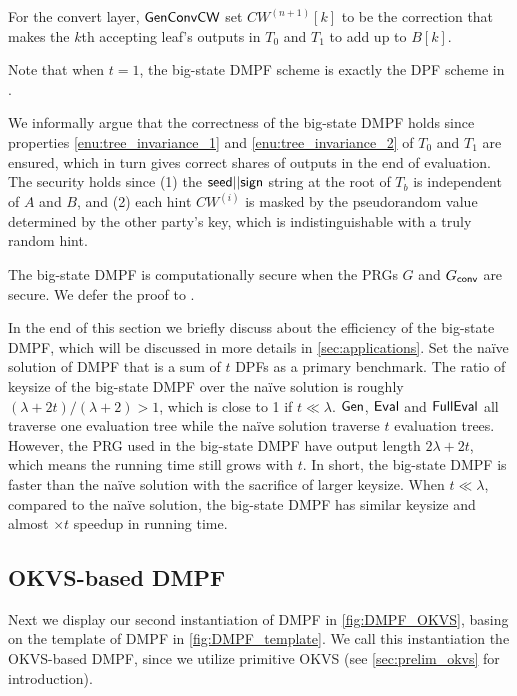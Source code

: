 For the convert layer, $\sf GenConvCW$ set $CW^{(n+1)}[k]$ to be the correction that makes the $k$th accepting leaf's outputs in $T_0$ and $T_1$ to add up to $B[k]$. 



\begin{remark}
  Note that when $t=1$, the big-state DMPF scheme is exactly the DPF scheme in \cite{CCS:BoyGilIsh16}. 
\end{remark}

We informally argue that the correctness of the big-state DMPF holds since properties \ref{enu:tree_invariance_1} and \ref{enu:tree_invariance_2} of $T_0$ and $T_1$ are ensured, which in turn gives correct shares of outputs in the end of evaluation. The security holds since (1) the ${\sf seed}||{\sf sign}$ string at the root of $T_b$ is independent of $A$ and $B$, and (2) each hint $CW^{(i)}$ is masked by the pseudorandom value determined by the other party's key, which is indistinguishable with a truly random hint. 

The big-state DMPF is computationally secure when the PRGs $G$ and $G_{\sf conv}$ are secure. We defer the proof to . 

In the end of this section we briefly discuss about the efficiency of the big-state DMPF, which will be discussed in more details in \cref{sec:applications}. Set the na\"ive solution of DMPF that is a sum of $t$ DPFs as a primary benchmark. The ratio of keysize of the big-state DMPF over the na\"ive solution is roughly $(\lambda+2t)/(\lambda+2)>1$, which is close to 1 if $t\ll \lambda$. ${\sf Gen}$, ${\sf Eval}$ and ${\sf FullEval}$ all traverse one evaluation tree while the na\"ive solution traverse $t$ evaluation trees. However, the PRG used in the big-state DMPF have output length $2\lambda+2t$, which means the running time still grows with $t$. In short, the big-state DMPF is faster than the na\"ive solution with the sacrifice of larger keysize. When $t\ll\lambda$, compared to the na\"ive solution, the big-state DMPF has similar keysize and almost $\times t$ speedup in running time. 

\subsection{OKVS-based DMPF}\label{sec:OKVS_based_DMPF}
Next we display our second instantiation of DMPF in \cref{fig:DMPF_OKVS}, basing on the template of DMPF in \cref{fig:DMPF_template}. We call this instantiation the OKVS-based DMPF, since we utilize primitive OKVS (see \cref{sec:prelim_okvs} for introduction). 

